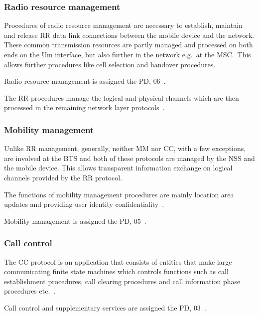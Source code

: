 \subsubsection{Radio resource management}
\label{sec:rr}
Procedures of radio resource management are necessary to establish,
maintain and release \gls{RR} data link connections between the mobile
device and the network. These common transmission resources are partly
managed and processed on both ends on the Um interface, but also
further in the network e.g.\ at the \gls{MSC}.\ This allows further
procedures like cell selection and handover procedures.

Radio resource management is assigned the \gls{PD},
$06$~\cite[p. 107]{gsmnetworks}.

The \gls{RR} procedures manage the logical and physical channels which
are then processed in the remaining network layer
protocols~\cite[p. 37--38]{layer32}.

\subsubsection{Mobility management}
\label{sec:mm}

Unlike \gls{RR} management, generally, neither \gls{MM} nor \gls{CC},
with a few exceptions, are involved at the \gls{BTS} and both of these
protocols are managed by the \gls{NSS} and the mobile device. This allows
transparent information exchange on logical channels provided by the
\gls{RR} protocol.

The functions of mobility management procedures are mainly location
area updates and providing user identity
confidentiality~\cite[p. 91]{layer32}.

Mobility management is assigned the \gls{PD},
$05$~\cite[p. 107]{gsmnetworks}.
\subsubsection{Call control}
\label{sec:cc}

The \gls{CC} protocol is an application that consists of entities that make
large communicating finite state machines which controls functions
such as call establishment procedures, call clearing procedures and
call information phase procedures etc.~\cite[p. 176]{layer32}.

Call control and supplementary services are assigned the \gls{PD},
$03$~\cite[p. 107]{gsmnetworks}.